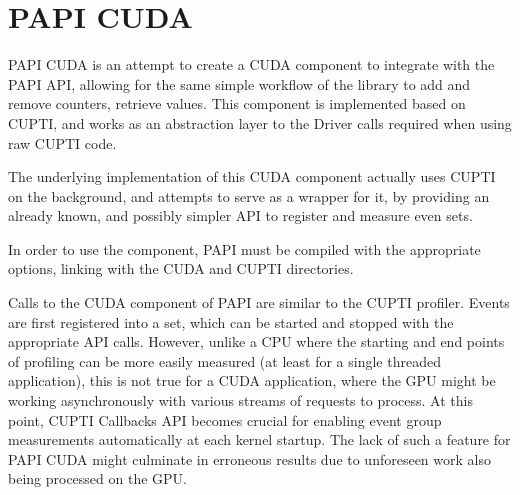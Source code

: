 \section{PAPI CUDA}
\label{sec:papi-cuda}

PAPI CUDA is an attempt to create a CUDA component to integrate with the PAPI API, allowing for the same simple workflow of the library to add and remove counters, retrieve values. This component is implemented based on CUPTI, and works as an abstraction layer to the Driver calls required when using raw CUPTI code.

The underlying implementation of this CUDA component actually uses CUPTI on the background, and attempts to serve as a wrapper for it, by providing an already known, and possibly simpler API to register and measure even sets.

In order to use the component, PAPI must be compiled with the appropriate options, linking with the CUDA and CUPTI directories.

Calls to the CUDA component of PAPI are similar to the CUPTI profiler. Events are first registered into a set, which can be started and stopped with the appropriate API calls. However, unlike a CPU where the starting and end points of profiling can be more easily measured (at least for a single threaded application), this is not true for a CUDA application, where the GPU might be working asynchronously with various streams of requests to process. At this point, CUPTI Callbacks API becomes crucial for enabling event group measurements automatically at each kernel startup. The lack of such a feature for PAPI CUDA might culminate in erroneous results due to unforeseen work also being processed on the GPU.
